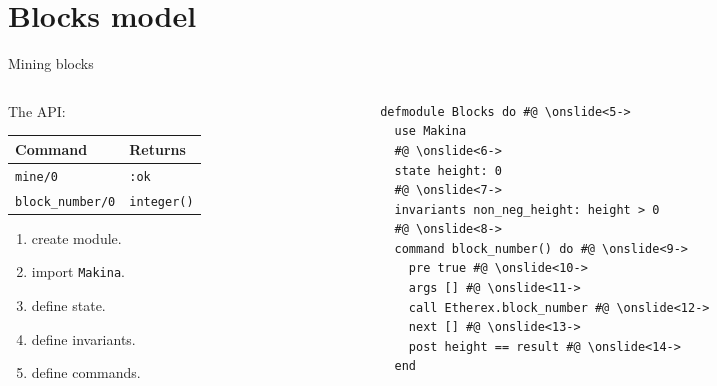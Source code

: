 \documentclass[aspectratio=169, 10pt, handout]{beamer}
\begin{document}
\section{Blocks model}
\label{sec:orge32723c}
\begin{frame}[label={sec:orga9b7c60},fragile]{Mining blocks}
 \begin{columns}
\begin{column}{0.48\columnwidth}
\onslide<+->
\onslide<+->
The API:
\onslide<+->
\begin{center}
\begin{tabular}{ll}
Command & Returns\\
\hline
\texttt{mine/0} & \texttt{:ok}\\
\texttt{block\_number/0} & \texttt{integer()}\\
\end{tabular}
\end{center}
\onslide<+->
\vspace{10pt}
\begin{enumerate}
\item create module.
\onslide<+->
\item import \texttt{Makina}.
\onslide<+->
\item define state.
\onslide<+->
\item define invariants.
\onslide<+->
\item define commands.
\end{enumerate}
\end{column}

\begin{column}{0.48\columnwidth}
\lstset{language=elixir,label= ,caption= ,captionpos=b,numbers=none,style=display}
\begin{lstlisting}
defmodule Blocks do #@ \onslide<5->
  use Makina
  #@ \onslide<6->
  state height: 0
  #@ \onslide<7->
  invariants non_neg_height: height > 0
  #@ \onslide<8->
  command block_number() do #@ \onslide<9->
    pre true #@ \onslide<10->
    args [] #@ \onslide<11->
    call Etherex.block_number #@ \onslide<12->
    next [] #@ \onslide<13->
    post height == result #@ \onslide<14->
  end
\end{lstlisting}
\end{column}
\end{columns}
\end{frame}
\end{document}
